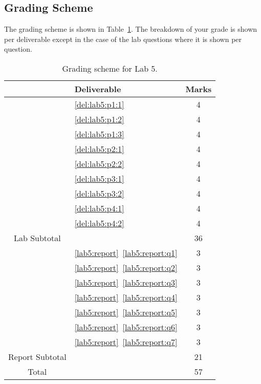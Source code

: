 \subsection{Grading Scheme}
The grading scheme is shown in Table~\ref{tab:lab5:grading}. The breakdown of
your grade is shown per deliverable except in the case of the lab
questions where it is shown per question.
%
\begin{table}
\centering
\begin{tabular}{c|l|c}
        & Deliverable           & Marks  \\ \hline
        & \ref{del:lab5:p1:1}         & 4       \\ \hline
        & \ref{del:lab5:p1:2}         & 4       \\ \hline
        & \ref{del:lab5:p1:3}         & 4      \\ \hline
        & \ref{del:lab5:p2:1}         & 4      \\ \hline
        & \ref{del:lab5:p2:2}         & 4       \\ \hline
        & \ref{del:lab5:p3:1}         & 4       \\ \hline
        & \ref{del:lab5:p3:2}         & 4       \\ \hline
        & \ref{del:lab5:p4:1}         & 4       \\ \hline
        & \ref{del:lab5:p4:2}         & 4       \\ \hhline{=|=|=}
Lab Subtotal&                       & 36      \\ \hhline{=|=|=}
        & \ref{lab5:report}~\ref{lab5:report:q1}  & 3       \\ \hline
        & \ref{lab5:report}~\ref{lab5:report:q2}  & 3       \\ \hline
        & \ref{lab5:report}~\ref{lab5:report:q3}  & 3       \\ \hline
        & \ref{lab5:report}~\ref{lab5:report:q4}  & 3      \\ \hline
        & \ref{lab5:report}~\ref{lab5:report:q5}  & 3      \\ \hline
        & \ref{lab5:report}~\ref{lab5:report:q6}  & 3      \\ \hline
        & \ref{lab5:report}~\ref{lab5:report:q7}  & 3      \\ \hhline{=|=|=}
Report Subtotal&  & 21 \\ \hhline{=|=|=}
  Total &                       & 57
\end{tabular}
\caption[Grading Scheme for Lab 5]{Grading scheme for Lab 5.}
\label{tab:lab5:grading}
\end{table}
%
